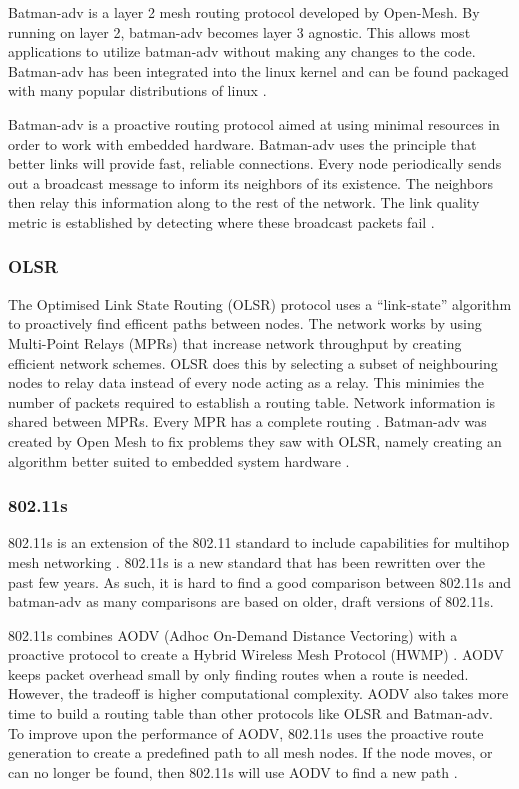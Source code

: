 Batman-adv is a layer 2 mesh routing protocol developed by Open-Mesh. By running on layer 2, batman-adv becomes layer 3 agnostic. This allows most applications to utilize batman-adv without making any changes to the code. Batman-adv has been integrated into the linux kernel and can be found packaged with many popular distributions of linux \cite{5375690}. 

Batman-adv is a proactive routing protocol aimed at using minimal resources in order to work with embedded hardware. 
Batman-adv uses the principle that better links will provide fast, reliable connections. Every node periodically sends out a broadcast message to inform its neighbors of its existence. The neighbors then relay this information along to the rest of the network. The link quality metric is established by detecting where these broadcast packets fail \cite{5375690}. 


\subsubsection{OLSR}

The Optimised Link State Routing (OLSR) protocol uses a ``link-state'' algorithm to proactively find efficent paths between nodes. The network works by using Multi-Point Relays (MPRs) that increase network throughput by creating efficient network schemes. OLSR does this by selecting a subset of neighbouring nodes to relay data instead of every node acting as a relay. This minimies the number of packets required to establish a routing table. Network information is shared between MPRs. Every MPR has a complete routing \cite{5375690}. Batman-adv was created by Open Mesh to fix problems they saw with OLSR, namely creating an algorithm better suited to embedded system hardware \cite{0032}. 

\subsubsection{802.11s}

802.11s is an extension of the 802.11 standard to include capabilities for multihop mesh networking \cite{6178212} \cite{5483777}. 802.11s is a new standard that has been rewritten over the past few years. As such, it is hard to find a good comparison between 802.11s and batman-adv as many comparisons are based on older, draft versions of 802.11s. 

802.11s combines AODV (Adhoc On-Demand Distance Vectoring) with a proactive protocol to create a Hybrid Wireless Mesh Protocol (HWMP) \cite{6379142}. AODV keeps packet overhead small by only finding routes when a route is needed. However, the tradeoff is higher computational complexity. AODV also takes more time to build a routing table than other protocols like OLSR and Batman-adv. To improve upon the performance of AODV, 802.11s uses the proactive route generation to create a predefined path to all mesh nodes. If the node moves, or can no longer be found, then 802.11s will use AODV to find a new path \cite{5483777}. 


